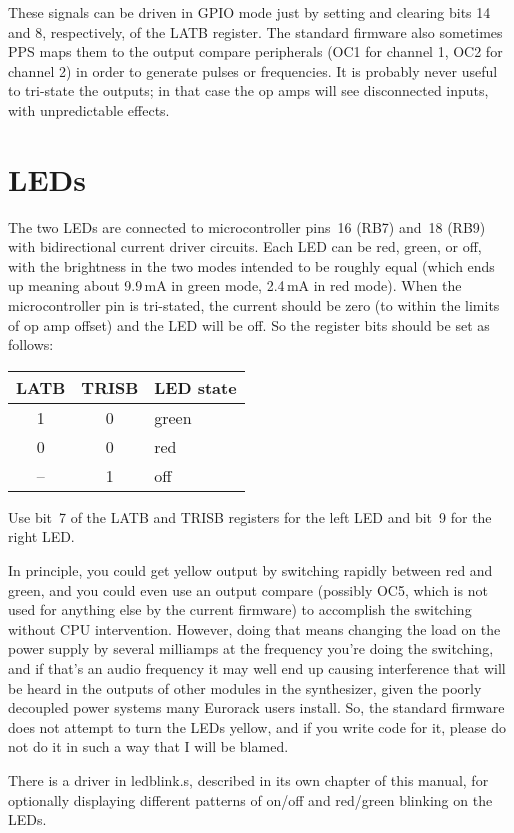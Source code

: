 These signals can be driven in GPIO mode just by setting and clearing bits
14 and 8, respectively, of the LATB register.  The standard firmware also
sometimes PPS maps them to the output compare peripherals (OC1 for channel
1, OC2 for channel 2) in order to generate pulses or frequencies.  It is
probably never useful to tri-state the outputs; in that case the op amps
will see disconnected inputs, with unpredictable effects.

\section{LEDs}

The two LEDs are connected to microcontroller pins~16 (RB7) and~18 (RB9)
with bidirectional current driver circuits.  Each LED can be red, green, or
off, with the brightness in the two modes intended to be roughly equal
(which ends up meaning about 9.9\,mA in green mode, 2.4\,mA in red mode). 
When the microcontroller pin is tri-stated, the current should be zero (to
within the limits of op amp offset) and the LED will be off.  So the
register bits should be set as follows:

\begin{tabular}{cc|l}
  LATB & TRISB & LED state \\ \hline
  1 & 0 & green \\
  0 & 0 & red \\
  -- & 1 & off
\end{tabular}

Use bit~7 of the LATB and TRISB registers for the left LED and bit~9 for the
right LED.

In principle, you could get yellow output by switching rapidly between red
and green, and you could even use an output compare (possibly OC5, which is
not used for anything else by the current firmware) to accomplish the
switching without CPU intervention.  However, doing that means changing the
load on the power supply by several milliamps at the frequency you're doing
the switching, and if that's an audio frequency it may well end up causing
interference that will be heard in the outputs of other modules in the
synthesizer, given the poorly decoupled power systems many Eurorack users
install.  So, the standard firmware does not attempt to turn the LEDs
yellow, and if you write code for it, please do not do it in such a way that
I will be blamed.

There is a driver in ledblink.s, described in its own chapter of this
manual, for optionally displaying different patterns of on/off and red/green
blinking on the LEDs.

